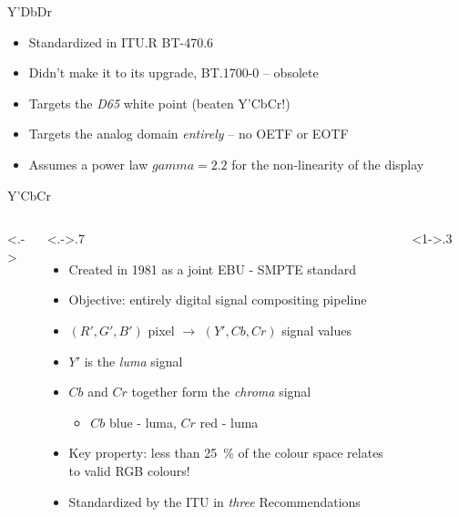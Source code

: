 \documentclass[aspectratio=169,handout,usepdftitle=false]{fireshonks}
\begin{document}
\begin{frame}{Y'DbDr}
    \begin{itemize}
        \item Standardized in ITU.R BT-470.6 \parencite*{BT470}
        \item Didn't make it to its upgrade, BT.1700-0 -- obsolete
        \item Targets the \emph{D65} white point (beaten Y'CbCr!)
        \item Targets the analog domain \emph{entirely} -- no OETF or EOTF
        \item Assumes a power law $gamma = 2.2$ for the non-linearity of the display
    \end{itemize}
\end{frame}
\begin{frame}{Y'CbCr}
    \begin{columns}<.->
        \begin{column}<.->{.7\textwidth}
            \begin{itemize}
                \item Created in 1981 as a joint EBU - SMPTE standard
                \item Objective: entirely digital signal compositing pipeline
                \item $(R', G', B')$ pixel $\rightarrow$ $(Y', Cb, Cr)$ signal values
                \item $Y'$ is the \emph{luma} signal
                \item $Cb$ and $Cr$ together form the \emph{chroma} signal
                      \begin{itemize}
                          \item $Cb$ blue - luma, $Cr$ red - luma
                      \end{itemize}
                \item Key property: less than \qty{25}{\percent} of the colour space relates to valid RGB colours! \autocite{7261497}
                \item Standardized by the ITU in \emph{three} Recommendations
            \end{itemize}
        \end{column}
        \begin{column}<1->{.3\textwidth}
            \begin{figure}

\end{figure}
\end{column}
\end{columns}
\end{frame}
\end{document}
